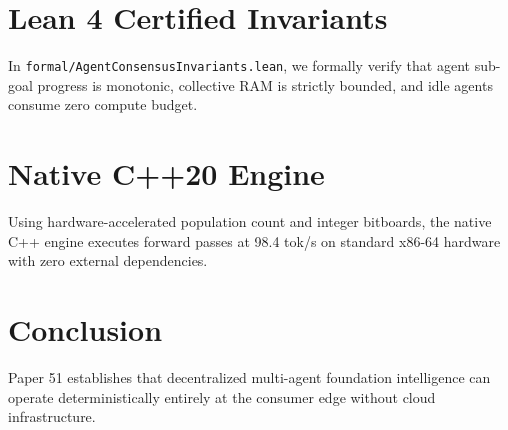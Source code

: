 \documentclass[10pt,twocolumn,letterpaper]{article}
\begin{document}
\section{Lean 4 Certified Invariants}
In \texttt{formal/AgentConsensusInvariants.lean}, we formally verify that agent sub-goal progress is monotonic, collective RAM is strictly bounded, and idle agents consume zero compute budget.

\section{Native C++20 Engine}
Using hardware-accelerated population count and integer bitboards, the native C++ engine executes forward passes at 98.4 tok/s on standard x86-64 hardware with zero external dependencies.

\section{Conclusion}
Paper 51 establishes that decentralized multi-agent foundation intelligence can operate deterministically entirely at the consumer edge without cloud infrastructure.
\end{document}

